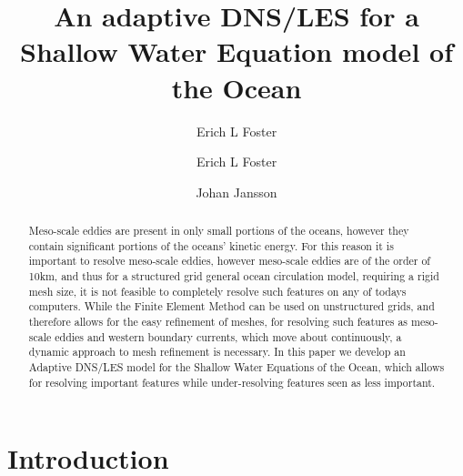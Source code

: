 \documentclass{elsarticle}
\author{Erich L Foster}
\begin{document}
  \begin{frontmatter}
    \author[1]{Erich L Foster}

    \author[1]{Johan Jansson}

    \address[1]{Basque Center for Applied Mathematics, Alameda Mazarredo, 14,
      48009 Bilbao, Basque Country -- Spain}

    \title{An adaptive DNS/LES for a Shallow Water Equation model of the Ocean}

    \begin{abstract}
      Meso-scale eddies are present in only small portions of the oceans,
      however they contain significant portions of the oceans' kinetic energy.
      For this reason it is important to resolve meso-scale eddies, however
      meso-scale eddies are of the order of 10km, and thus for a structured grid
      general ocean circulation model, requiring a rigid mesh size, it is not
      feasible to completely resolve such features on any of todays computers.
      While the Finite Element Method can be used on unstructured grids, and
      therefore allows for the easy refinement of meshes, for resolving such
      features as meso-scale eddies and western boundary currents, which move
      about continuously, a dynamic approach to mesh refinement is necessary. In
      this paper we develop an Adaptive DNS/LES model for the Shallow Water
      Equations of the Ocean, which allows for resolving important features
      while under-resolving features seen as less important.
    \end{abstract}
  \end{frontmatter}

  \section{Introduction} \label{sec:Intro}
  

  
  
\end{document}
